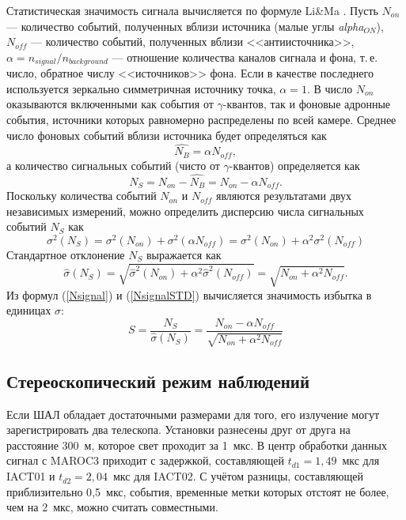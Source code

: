 \documentclass[magd,floatypics,numeref]{msudipl} %
\begin{document}
Статистическая значимость сигнала вычисляется по формуле Li\&Ma \cite{1983ApJ...272..317L}. Пусть $N_{on}$ --- количество событий, полученных вблизи источника (малые углы \textit{alpha$_{ON}$}), $N_{off}$ --- количество событий, полученных вблизи <<антиисточника>>, $\alpha = n_{signal}/n_{background}$ --- отношение количества каналов сигнала и фона, т.\,е. число, обратное числу <<источников>> фона. Если в качестве последнего используется зеркально симметричная источнику точка, $\alpha=1$. В число $N_{on}$ оказываются включенными как события от $\gamma$-квантов, так и фоновые адронные события, источники которых равномерно распределены по всей камере. Среднее число фоновых событий вблизи источника будет определяться как
\begin{equation}
\hat{N_B} = \alpha N_{off},
\end{equation}
а количество сигнальных событий (чисто от $\gamma$-квантов) определяется как 
\begin{equation}
\label{Nsignal}
N_S = N_{on} - \hat{N_B} = N_{on} - \alpha N_{off}.
\end{equation}
Поскольку количества событий $N_{on}$ и $N_{off}$ являются результатами двух независимых измерений, можно определить дисперсию числа сигнальных событий $N_S$ как
\begin{equation}
\sigma^2(N_S) = \sigma^2(N_{on}) + \sigma^2 (\alpha N_{off}) =\sigma^2 (N_{on}) + \alpha^2 \sigma^2 (N_{off})
\end{equation}
Стандартное отклонение $N_S$ выражается как
\begin{equation}
\label{NsignalSTD}
\hat{\sigma}(N_S) = \sqrt{\hat{\sigma}^2(N_{on})+\alpha^2 \hat{\sigma}^2(N_{off})} = \sqrt{N_{on}+\alpha^2 N_{off}}.
\end{equation}
Из формул (\ref{Nsignal}) и (\ref{NsignalSTD}) вычисляется значимость избытка в единицах $\sigma$:
\begin{equation}
\label{LiMaConfident}
S = \frac{N_S}{\hat \sigma (N_S)} = \frac{N_{on} - \alpha N_{off}}{\sqrt{N_{on} + \alpha^2 N_{off}}}
\end{equation}

\subsection{Стереоскопический режим наблюдений}
Если ШАЛ обладает достаточными размерами для того, его излучение могут зарегистрировать два телескопа. Установки разнесены друг от друга на расстояние 300~м, которое свет проходит за 1~мкс. В центр обработки данных сигнал с MAROC3 приходит с задержкой, составляющей $t_{d1}=1{,}49$~мкс для IACT01 и $t_{d2} = 2{,}04$~мкс для IACT02. С учётом разницы, составляющей приблизительно 0{,}5~мкс, события, временные метки которых отстоят не более, чем на 2~мкс, можно считать совместными. 
\end{document}
